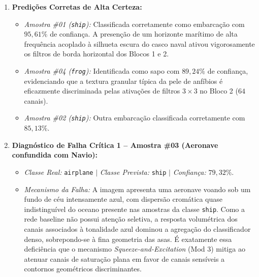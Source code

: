 \documentclass[runningheads]{llncs}
\begin{document}
\begin{enumerate}
    \item \textbf{Predi\c{c}\~{o}es Corretas de Alta Certeza:}
    \begin{itemize}
        \item \textit{Amostra \#01 (\texttt{ship}):} Classificada corretamente como embarca\c{c}\~{a}o com \textbf{$95{,}61\%$} de confian\c{c}a. A presen\c{c}\~{a}o de um horizonte mar\'{i}timo de alta frequ\^{e}ncia acoplado \`{a} silhueta escura do casco naval ativou vigorosamente os filtros de borda horizontal dos Blocos 1 e 2.
        \item \textit{Amostra \#04 (\texttt{frog}):} Identificada como sapo com \textbf{$89{,}24\%$} de confian\c{c}a, evidenciando que a textura granular t\'{i}pica da pele de anf\'{i}bios \'{e} eficazmente discriminada pelas ativa\c{c}\~{o}es de filtros $3 \times 3$ no Bloco 2 ($64$ canais).
        \item \textit{Amostra \#02 (\texttt{ship}):} Outra embarca\c{c}\~{a}o classificada corretamente com \textbf{$85{,}13\%$}.
    \end{itemize}

    \item \textbf{Diagn\'{o}stico de Falha Cr\'{i}tica 1 -- Amostra \#03 (Aeronave confundida com Navio):}
    \begin{itemize}
        \item \textit{Classe Real:} \texttt{airplane} $\mid$ \textit{Classe Prevista:} \texttt{ship} $\mid$ \textit{Confian\c{c}a:} \textbf{$79{,}32\%$}.
        \item \textit{Mecanismo da Falha:} A imagem apresenta uma aeronave voando sob um fundo de c\'{e}u intensamente azul, com dispers\~{a}o crom\'{a}tica quase indistingu\'{i}vel do oceano presente nas amostras da classe \texttt{ship}. Como a rede baseline n\~{a}o possui aten\c{c}\~{a}o seletiva, a resposta volum\'{e}trica dos canais associados \`{a} tonalidade azul dominou a agrega\c{c}\~{a}o do classificador denso, sobrepondo-se \`{a} fina geometria das asas. \'{E} exatamente essa defici\^{e}ncia que o mecanismo \textit{Squeeze-and-Excitation} (Mod 3) mitiga ao atenuar canais de satura\c{c}\~{a}o plana em favor de canais sens\'{i}veis a contornos geom\'{e}tricos discriminantes.
    \end{itemize}


\end{enumerate}
\end{document}

